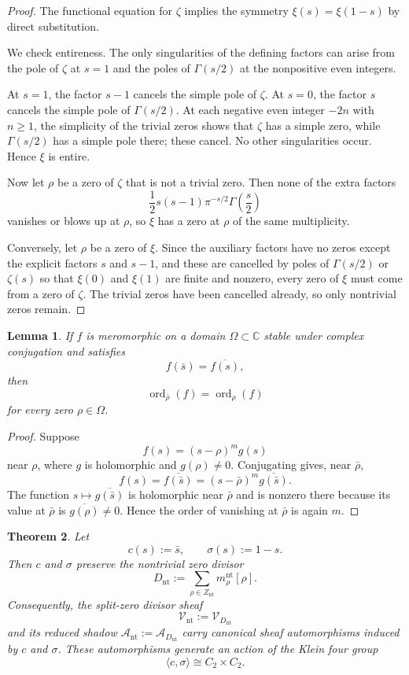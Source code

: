 \documentclass[11pt,a4paper]{article}
\newtheorem{theorem}{Theorem}[section]
\newtheorem{lemma}[theorem]{Lemma}
\theoremstyle{definition}
\theoremstyle{remark}
\DeclareMathOperator{\ord}{ord}
\newcommand{\CC}{\mathbb C}
\begin{document}
\begin{proof}
The functional equation for \(\zeta\) implies the symmetry \(\xi(s)=\xi(1-s)\) by direct substitution.

We check entireness. The only singularities of the defining factors can arise from the pole of \(\zeta\) at \(s=1\) and the poles of \(\Gamma(s/2)\) at the nonpositive even integers.

At \(s=1\), the factor \(s-1\) cancels the simple pole of \(\zeta\). At \(s=0\), the factor \(s\) cancels the simple pole of \(\Gamma(s/2)\). At each negative even integer \(-2n\) with \(n\ge1\), the simplicity of the trivial zeros shows that \(\zeta\) has a simple zero, while \(\Gamma(s/2)\) has a simple pole there; these cancel. No other singularities occur. Hence \(\xi\) is entire.

Now let \(\rho\) be a zero of \(\zeta\) that is not a trivial zero. Then none of the extra factors
\[
\frac12s(s-1)\pi^{-s/2}\Gamma\left(\frac{s}{2}\right)
\]
vanishes or blows up at \(\rho\), so \(\xi\) has a zero at \(\rho\) of the same multiplicity.

Conversely, let \(\rho\) be a zero of \(\xi\). Since the auxiliary factors have no zeros except the explicit factors \(s\) and \(s-1\), and these are cancelled by poles of \(\Gamma(s/2)\) or \(\zeta(s)\) so that \(\xi(0)\) and \(\xi(1)\) are finite and nonzero, every zero of \(\xi\) must come from a zero of \(\zeta\). The trivial zeros have been cancelled already, so only nontrivial zeros remain.
\end{proof}

\begin{lemma}
If \(f\) is meromorphic on a domain \(\Omega\subset\CC\) stable under complex conjugation and satisfies
\[
f(\bar s)=\overline{f(s)},
\]
then
\[
\ord_{\bar\rho}(f)=\ord_\rho(f)
\]
for every zero \(\rho\in\Omega\).
\end{lemma}

\begin{proof}
Suppose
\[
f(s)=(s-\rho)^m g(s)
\]
near \(\rho\), where \(g\) is holomorphic and \(g(\rho)\ne0\). Conjugating gives, near \(\bar\rho\),
\[
f(s)=\overline{f(\bar s)}=(s-\bar\rho)^m\overline{g(\bar s)}.
\]
The function \(s\mapsto\overline{g(\bar s)}\) is holomorphic near \(\bar\rho\) and is nonzero there because its value at \(\bar\rho\) is \(\overline{g(\rho)}\ne0\). Hence the order of vanishing at \(\bar\rho\) is again \(m\).
\end{proof}

\begin{theorem}
Let
\[
c(s):=\bar s,
\qquad
\sigma(s):=1-s.
\]
Then \(c\) and \(\sigma\) preserve the nontrivial zero divisor
\[
D_{\mathrm{nt}}:=\sum_{\rho\in Z_{\mathrm{nt}}}m^{\mathrm{nt}}_\rho[\rho].
\]
Consequently, the split-zero divisor sheaf
\[
\mathcal V_{\mathrm{nt}}:=\mathcal V_{D_{\mathrm{nt}}}
\]
and its reduced shadow \(\mathcal A_{\mathrm{nt}}:=\mathcal A_{D_{\mathrm{nt}}}\) carry canonical sheaf automorphisms induced by \(c\) and \(\sigma\). These automorphisms generate an action of the Klein four group
\[
\langle c,\sigma\rangle\cong C_2\times C_2.
\]
\end{theorem}
\end{document}
